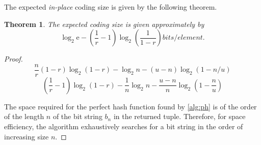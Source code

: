 \documentclass[hidelinks,11pt,final]{article}
\newcommand{\envnumstyle}{section}
\theoremstyle{plain}
\newtheorem{theorem}{Theorem}[\envnumstyle]
\begin{document}
The expected \emph{in-place} coding size is given by the following theorem.
\begin{theorem}
The expected coding size is given approximately by
\begin{equation}
\label{eq:code_size}
    \log_2 \mathrm{e} - \left(\frac{1}{r} - 1\right) \log_2\!\left(\frac{1}{1-r}\right) \si{bits \per element}.
\end{equation}
\end{theorem}
\begin{proof}
\begin{equation}
    \frac{n}{r}(1 - r) \log_2 \left(1 - r\right) - \log_2 n - (u - n) \log_2 (1 - n/u)
\end{equation}
\begin{equation}
    \left(\frac{1}{r} - 1\right) \log_2 \left(1 - r\right) - \frac{1}{n}\log_2 n - \frac{u - n}{n} \log_2\left(1 - \frac{n}{u}\right)
\end{equation}

The space required for the perfect hash function found by \cref{alg:ph} is of the order of the length $n$ of the bit string $b_n$ in the returned tuple. Therefore, for space efficiency, the algorithm exhaustively searches for a bit string in the order of increasing size $n$.


\end{proof}
\end{document}
